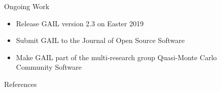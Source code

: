 \documentclass[final]{beamer}
\newlength{\sepwid}
\newlength{\onecolwid}
\newlength{\twocolwid}
\begin{document}
\begin{frame}[t]
\begin{columns}[t]
\begin{column}{\twocolwid}
\begin{column}{\twocolwid}
\begin{columns}[t,totalwidth=\twocolwid]
\begin{column}{\onecolwid}
	
\end{column} %

\end{columns} %

\end{column}

\end{column} %

\begin{column}{\sepwid}\end{column} %

\begin{column}{\onecolwid} %




\begin{alertblock}{Ongoing Work}

\begin{itemize} 
\item Release GAIL version 2.3 on Easter 2019
\item Submit GAIL to the Journal of Open Source Software
\item Make GAIL part of the multi-research group Quasi-Monte Carlo Community Software
\end{itemize}

\end{alertblock}


\begin{block}{References}

\nocite{*} %
\small{  %
\vspace{0.8in}}


\end{block}
\end{column}
\end{columns}
\end{frame}
\end{document}
